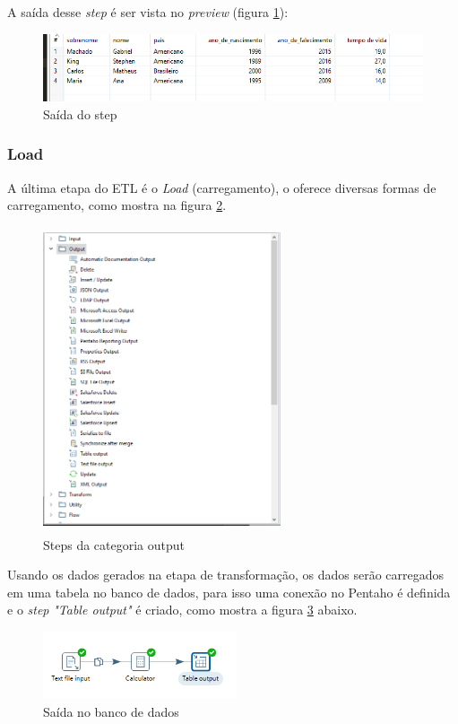 A saída desse \textit{step} é ser vista no \textit{preview} (figura \ref{preview}):
\begin{figure}[H]
\centering
\includegraphics[height=2cm]{imagens/saidavida.png}
\caption{Saída do step}
\label{preview}
\end{figure}
\subsubsection{Load}
A última etapa do ETL é o \textit{Load} (carregamento), o \pdi oferece diversas formas de carregamento, como mostra na figura \ref{outputsteps}.
\begin{figure}[H]
\centering
\includegraphics[width=7cm, height=9cm]{imagens/output.png}
\caption{Steps da categoria output}
\label{outputsteps}
\end{figure}
Usando os dados gerados na etapa de transformação, os dados serão carregados em uma tabela no banco de dados, para isso uma conexão no Pentaho é definida e o \textit{step} \textit{"Table output"} é criado, como mostra a figura \ref{outputstep} abaixo.
\begin{figure}[H]
\centering
\includegraphics[height=2cm]{imagens/tableoutput.png}
\caption{Saída no banco de dados}
\label{outputstep}
\end{figure}
